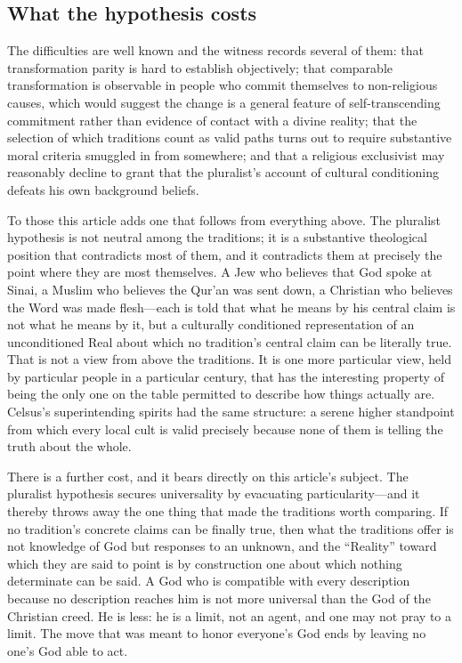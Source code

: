 \subsection{What the hypothesis costs}

The difficulties are well known and the witness records several of them: that transformation parity is hard to establish objectively; that comparable transformation is observable in people who commit themselves to non-religious causes, which would suggest the change is a general feature of self-transcending commitment rather than evidence of contact with a divine reality; that the selection of which traditions count as valid paths turns out to require substantive moral criteria smuggled in from somewhere; and that a religious exclusivist may reasonably decline to grant that the pluralist's account of cultural conditioning defeats his own background beliefs.

To those this article adds one that follows from everything above. The pluralist hypothesis is not neutral among the traditions; it is a substantive theological position that contradicts most of them, and it contradicts them at precisely the point where they are most themselves. A Jew who believes that God spoke at Sinai, a Muslim who believes the Qur'an was sent down, a Christian who believes the Word was made flesh---each is told that what he means by his central claim is not what he means by it, but a culturally conditioned representation of an unconditioned Real about which no tradition's central claim can be literally true. That is not a view from above the traditions. It is one more particular view, held by particular people in a particular century, that has the interesting property of being the only one on the table permitted to describe how things actually are. Celsus's superintending spirits had the same structure: a serene higher standpoint from which every local cult is valid precisely because none of them is telling the truth about the whole.

There is a further cost, and it bears directly on this article's subject. The pluralist hypothesis secures universality by evacuating particularity---and it thereby throws away the one thing that made the traditions worth comparing. If no tradition's concrete claims can be finally true, then what the traditions offer is not knowledge of God but responses to an unknown, and the ``Reality'' toward which they are said to point is by construction one about which nothing determinate can be said. A God who is compatible with every description because no description reaches him is not more universal than the God of the Christian creed. He is less: he is a limit, not an agent, and one may not pray to a limit. The move that was meant to honor everyone's God ends by leaving no one's God able to act.

